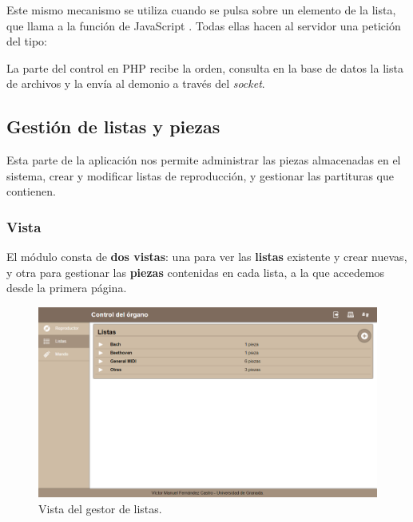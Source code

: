 Este mismo mecanismo se utiliza cuando se pulsa sobre un elemento de la lista, que llama a la función de JavaScript . Todas ellas hacen al servidor una petición del tipo: 

\begin{center}
\end{center}

La parte del control en \acrshort{PHP} recibe la orden, consulta en la base de datos la lista de archivos y la envía al demonio a través del \textit{socket}.

\subsection{Gestión de listas y piezas}
\label{subsec:impl_gestor}

Esta parte de la aplicación nos permite administrar las piezas almacenadas en el sistema, crear y modificar listas de reproducción, y gestionar las partituras que contienen.

\subsubsection{Vista}

El módulo consta de \textbf{dos vistas}: una para ver las \textbf{listas} existente y crear nuevas, y otra para gestionar las \textbf{piezas} contenidas en cada lista, a la que accedemos desde la primera página.

\smallskip

\begin{figure}[H]
	\noindent \begin{centering}
		\includegraphics[width=\linewidth*3/4]{capitulo5/cap_listas}
		\par\end{centering}
	\smallskip
	\caption{\label{fig:cap_listas} Vista del gestor de listas.}
\end{figure} 

